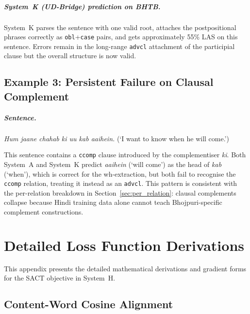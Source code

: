 \documentclass[12pt,a4paper,oneside]{report}
\begin{document}
\paragraph{System~K (UD-Bridge) prediction on BHTB.}
System~K parses the sentence with one valid root, attaches the postpositional
phrases correctly as \texttt{obl}+\texttt{case} pairs, and gets approximately
55\% LAS on this sentence. Errors remain in the long-range \texttt{advcl}
attachment of the participial clause but the overall structure is now valid.

\section{Example 3: Persistent Failure on Clausal Complement}

\paragraph{Sentence.}
\emph{Hum jaane chahab ki uu kab aaihein.} (`I want to know when he will come.')

This sentence contains a \texttt{ccomp} clause introduced by the complementiser
\emph{ki}. Both System~A and System~K predict \emph{aaihein} (`will come') as
the head of \emph{kab} (`when'), which is correct for the wh-extraction, but
both fail to recognise the \texttt{ccomp} relation, treating it instead as an
\texttt{advcl}. This pattern is consistent with the per-relation breakdown in
Section~\ref{sec:per_relation}: clausal complements collapse because Hindi
training data alone cannot teach Bhojpuri-specific complement constructions.


\chapter{Detailed Loss Function Derivations}
\label{app:loss_deriv}

This appendix presents the detailed mathematical derivations and gradient
forms for the SACT objective in System~H.

\section{Content-Word Cosine Alignment}
\end{document}
